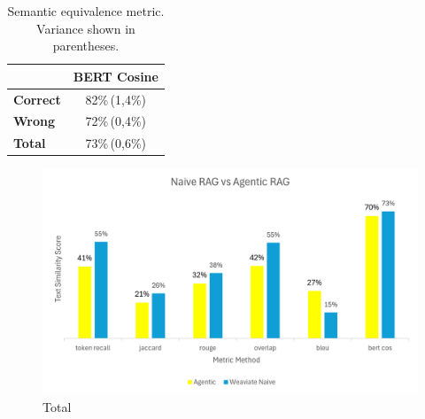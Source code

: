 \begin{table}[h]
\centering
\begin{tabular}{lc}
\hline
 & BERT Cosine \\
\hline
\textbf{Correct} & 82\%\,(1,4\%) \\
\textbf{Wrong}   & 72\%\,(0,4\%) \\
\textbf{Total}   & 73\%\,(0,6\%) \\
\hline
\end{tabular}
\caption{Semantic equivalence metric. Variance shown in parentheses.}
\end{table}

%

\begin{figure}
    \centering
    \includegraphics[width=0.75\linewidth]{Naive Rag vs Agentic Rag.png}
    \caption{Total}
    \label{fig:placeholder}
\end{figure}
